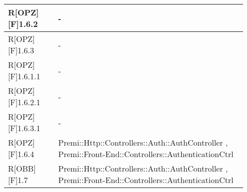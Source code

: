 \begin{table}[h]
\begin{center}
\begin{tabular}{|p{0.2\linewidth}|p{0.75\linewidth}|}
			R[OPZ][F]1.6.2 & -\\
		\midrule
			R[OPZ][F]1.6.3 & -\\
		\midrule
			R[OPZ][F]1.6.1.1 & -\\
		\midrule
			R[OPZ][F]1.6.2.1 & -\\
		\midrule
			R[OPZ][F]1.6.3.1 & -\\
		\midrule
			R[OPZ][F]1.6.4 & Premi::Http::Controllers::Auth::AuthController , Premi::Front-End::Controllers::AuthenticationCtrl\\
		\midrule
			R[OBB][F]1.7 & Premi::Http::Controllers::Auth::AuthController , Premi::Front-End::Controllers::AuthenticationCtrl\\
		
		\bottomrule
	\end{tabular}
\end{center}
\end{table}


